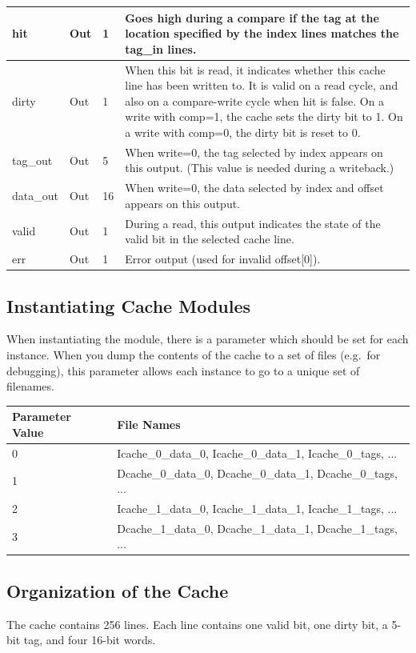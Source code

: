 \documentclass[11pt]{article}
\begin{document}
\begin{center}
\begin{longtable}{|>{\ttfamily}p{1.0in}|p{0.6in}|p{0.5in}|p{3.4in}|}
\hline
hit & Out & 1 & Goes high during a compare if the tag at the location specified by the index lines matches the tag\_in lines. \\
\hline
dirty & Out & 1 & When this bit is read, it indicates whether this cache line has been written to. It is valid on a read cycle, and also on a compare-write cycle when hit is false. On a write with comp=1, the cache sets the dirty bit to 1. On a write with comp=0, the dirty bit is reset to 0. \\
\hline
tag\_out & Out & 5 & When write=0, the tag selected by index appears on this output. (This value is needed during a writeback.) \\
\hline
data\_out & Out & 16 & When write=0, the data selected by index and offset appears on this output. \\
\hline
valid & Out & 1 & During a read, this output indicates the state of the valid bit in the selected cache line. \\
\hline
err & Out & 1 & Error output (used for invalid offset[0]). \\
\hline
\end{longtable}
\end{center}

\subsection{Instantiating Cache Modules}
When instantiating the module, there is a parameter which should be set for each instance. When you dump the contents of the cache to a set of files (e.g.\ for debugging), this parameter allows each instance to go to a unique set of filenames.

\begin{center}
\begin{tabular}{|l|l|}
\hline
Parameter Value & File Names \\
\hline
\hline
0 & Icache\_0\_data\_0, Icache\_0\_data\_1, Icache\_0\_tags, ... \\
\hline
1 & Dcache\_0\_data\_0, Dcache\_0\_data\_1, Dcache\_0\_tags, ... \\
\hline
2 & Icache\_1\_data\_0, Icache\_1\_data\_1, Icache\_1\_tags, ... \\
\hline
3 & Dcache\_1\_data\_0, Dcache\_1\_data\_1, Dcache\_1\_tags, ... \\
\hline
\hline
\end{tabular}
\end{center}

\subsection{Organization of the Cache}
The cache contains 256 lines. Each line contains one valid bit, one dirty bit, a 5-bit tag, and four 16-bit words.
\end{document}
